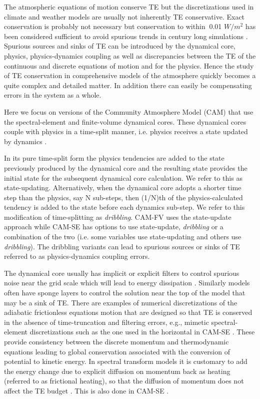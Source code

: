 \documentclass{agujournal}
\begin{document}
The atmospheric equations of motion conserve TE but the discretizations used in climate and weather models are usually not inherently TE conservative. Exact conservation is probably not necessary but conservation to within $~$0.01  $W/m^2$ has been considered sufficient to avoid spurious trends in century long simulations \citep{B2000S,WOHTTV2015JAMES}. Spurious sources and sinks of TE can be introduced by the dynamical core, physics, physics-dynamics coupling as well as discrepancies between the TE of the continuous and discrete equations of motion and for the physics. Hence the study of TE conservation in comprehensive models of the atmosphere quickly becomes a quite complex and detailed matter. In addition there can easily be compensating errors in the system as a whole.

Here we focus on versions of the Community Atmosphere Model (CAM) that use the spectral-element \citep[SE, ][]{LetAl2018JAMES} and finite-volume \citep[FV, ][]{L2004MWR} dynamical cores. These dynamical cores couple with physics in a time-split manner, i.e. physics receives a state updated by dynamics \citep[see ][ for a discussion of time-split versus process split physics-dynamics coupling in the context of CAM]{W2002MWR}.

In its pure time-split form the physics tendencies are added to the state previously produced by the dynamical core and the resulting state provides the initial state for the subsequent dynamical core calculation. We refer to this as state-updating. Alternatively, when the dynamical core adopts a shorter time step than the physics, say N sub-steps, then (1/N)th of the physics-calculated tendency is added to the state before each dynamics sub-step. We refer to this modification of time-splitting as {\em{dribbling}}. CAM-FV uses the state-update approach while CAM-SE has options to use state-update, {\em{dribbling}} or a combination of the two (i.e. some variables use state-updating and others use {\em{dribbling}}). The dribbling variants can lead to spurious sources or sinks of TE referred to as physics-dynamics coupling errors.

The dynamical core usually has implicit or explicit filters to control spurious noise near the grid scale which will lead to energy dissipation \citep{T2008JCP,JW2010LNCSE}. Similarly models often have sponge layers to control the solution near the top of the model that may be a sink of TE. There are examples of numerical discretizations of the adiabatic frictionless equations motion that are designed so that TE is conserved in the absence of time-truncation and filtering errors, e.g., mimetic spectral-element discretizations such as the one used in the horizontal in CAM-SE \citep{T2011LNCSEb}. These provide consistency between the discrete momentum and thermodynamic equations leading to global conservation associated with the conversion of potential to kinetic energy. In spectral transform models it is customary to add the energy change due to explicit diffusion on momentum back as heating (referred to as frictional heating), so that the diffusion of momentum does not affect the TE budget \citep[see, e.g., p.71 in ][]{CAM5}. This is also done in CAM-SE \citep{LetAl2018JAMES}. 
\end{document}
